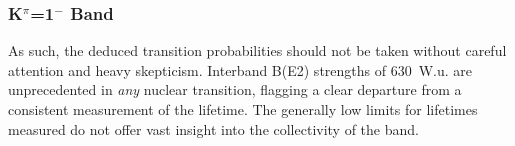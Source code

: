 \subsubsection{K$^\pi$=1$^-$ Band}

As such, the deduced transition probabilities should not be taken without careful attention and heavy skepticism. Interband B(E2) strengths of 630~W.u. are unprecedented in \textit{any} nuclear transition, flagging a clear departure from a consistent measurement of the lifetime. The generally low limits for lifetimes measured do not offer vast insight into the collectivity of the band.






